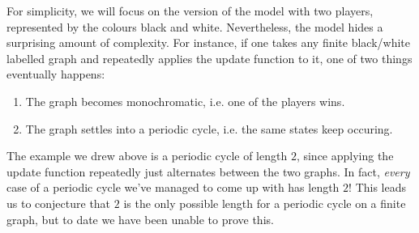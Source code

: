 \documentclass{article}
\begin{document}
\begin{center}
\end{center}

For simplicity, we will focus on the version of the model with two players, represented by the colours black and white. Nevertheless, the model hides a surprising amount of complexity. For instance, if one takes any finite black/white labelled graph and repeatedly applies the update function to it, one of two things eventually happens:

\begin{enumerate}
  \item The graph becomes monochromatic, i.e. one of the players wins.
  \item The graph settles into a periodic cycle, i.e. the same states keep occuring.
\end{enumerate}

The example we drew above is a periodic cycle of length $2$, since applying the update function repeatedly just alternates between the two graphs. In fact, \emph{every} case of a periodic cycle we've managed to come up with has length $2$! This leads us to conjecture that $2$ is the only possible length for a periodic cycle on a finite graph, but to date we have been unable to prove this.

\end{document}
